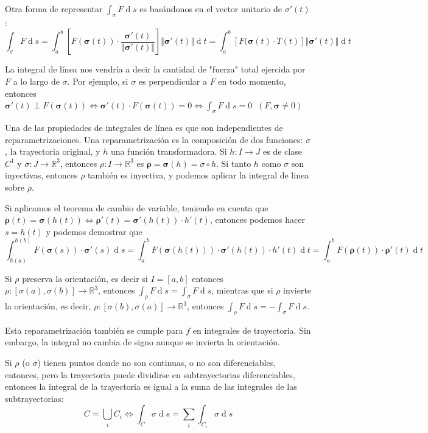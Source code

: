 \documentclass[a4paper]{article}
\renewcommand{\d}[1]{\ensuremath{\operatorname{d}\!{#1}}}
\begin{document}
Otra forma de representar $\int_\sigma F \d{s}$ es basándonos en el vector unitario de $\sigma'(t)$:
\[ \int_\sigma F \d{s} = \int_a^b \left[F(\boldsymbol{\sigma}(t))\cdot\frac{\boldsymbol{\sigma}'(t)}{\Vert\boldsymbol{\sigma}'(t)\Vert} \right] \Vert\boldsymbol{\sigma}'(t)\Vert \d{t} = \int_a^b [F(\boldsymbol{\sigma}(t)·T(t)]\Vert\boldsymbol{\sigma}'(t)\Vert \d{t} \]

La integral de línea nos vendría a decir la cantidad de "fuerza" total ejercida por $F$ a lo largo de $\sigma$. Por ejemplo, si $\sigma$ es perpendicular a $F$ en todo momento, entonces $\boldsymbol{\sigma}'(t) \perp F(\boldsymbol{\sigma}(t))\iff\boldsymbol{\sigma}'(t) \cdot F(\boldsymbol{\sigma}(t)) = 0 \iff \int_\sigma F \d{s} = 0 \;\; (F, \boldsymbol{\sigma} \neq 0)$

Una de las propiedades de integrales de línea es que son independientes de reparametrizaciones. Una reparametrización es la composición de dos funciones: $\sigma$, la trayectoria original, y $h$ una función transformadora. Si $h: I \rightarrow J$ es de clase $C^1$ y $\sigma: J \rightarrow \mathbb{R}^3$, entonces $\rho : I \rightarrow \mathbb{R}^3$ es $\boldsymbol{\rho} = \boldsymbol{\sigma}(h) = \sigma \circ h$. Si tanto $h$ como $\sigma$ son inyectivas, entonces $\rho$ también es inyectiva, y podemos aplicar la integral de linea sobre $\rho$.

Si aplicamos el teorema de cambio de variable, teniendo en cuenta que $\boldsymbol{\rho}(t) = \boldsymbol{\sigma}(h(t)) \iff \boldsymbol{\rho}'(t) = \boldsymbol{\sigma}'(h(t))\cdot h'(t)$, entonces podemos hacer $s = h(t)$ y podemos demostrar que
\[ \int_{h(a)}^{h(b)}F(\boldsymbol{\sigma}(s))\cdot\boldsymbol{\sigma}'(s) \d{s} = \int_a^b F(\boldsymbol{\sigma}(h(t)))\cdot\boldsymbol{\sigma}'(h(t))\cdot h'(t) \d{t} = \int_a^b F(\boldsymbol{\rho}(t)) \cdot \boldsymbol{\rho}'(t) \d{t} \]

Si $\rho$ preserva la orientación, es decir si $I = [a,b]$ entonces $\rho : [\sigma(a), \sigma(b)] \rightarrow\mathbb{R}^3$, entonces $\int_\rho F \d{s} = \int_\sigma F \d{s}$, mientras que si $\rho$ invierte la orientación, es decir, $\rho : [\sigma(b), \sigma(a)]\rightarrow\mathbb{R}^3$, entonces $\int_ \rho F \d{s} = -\int_\sigma F \d{s}$. 

Esta reparametrización también se cumple para $f$ en integrales de trayectoria. Sin embargo, la integral no cambia de signo aunque se invierta la orientación.

Si $\rho$ (o $\sigma$) tienen puntos donde no son continuas, o no son diferenciables, entonces, pero la trayectoria puede dividirse en subtrayectorias diferenciables, entonces la integral de la trayectoria es igual a la suma de las integrales de las subtrayectorias:
\[ C = \bigcup_i C_i \iff \int_C \sigma \d{s} = \sum_i \int_{C_i} \sigma \d{s} \]
\end{document}
